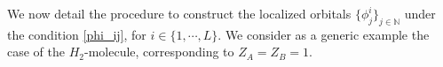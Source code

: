 \documentclass[11pt]{elsarticle}
\let \leq \leqslant
\let \epsilon \varepsilon
\newcommand{\R} {\ensuremath{\mathbb{R}}}
\newcommand{\N} {\ensuremath{\mathbb{N}}}
\begin{document}
We now detail the procedure to construct the localized orbitals $\big\{\phi_j^{i}\big\}_{j \in \N}$ under the condition \eqref{phi_ij},  for $i \in \{1,\cdots,L\}$. We consider as a generic example the case of the $H_2$-molecule, corresponding to $Z_A=Z_B=1$.\\
\\
\end{document}
